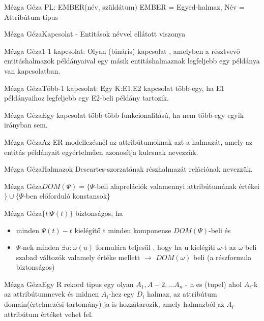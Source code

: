 \begin{definicio}{Mézga Géza}
PL: EMBER(név, szüldátum) EMBER = Egyed-halmaz, Név = Attribútum-típus
\end{definicio}\begin{definicio}{Mézga Géza}Kapcsolat - Entitások névvel ellátott viszonya
\end{definicio}\begin{definicio}{Mézga Géza}1-1 kapcsolat: Olyan (bináris) kapcsolat , amelyben a résztvevő entitáshalmazok példányaival egy másik entitáshalmaznak legfeljebb egy példánya van kapcsolatban.
\end{definicio}\begin{definicio}{Mézga Géza}Több-1 kapcsolat: Egy K:E1,E2 kapcsolat több-egy, ha E1 példányaihoz legfeljebb egy E2-beli példány tartozik.
\end{definicio}\begin{definicio}{Mézga Géza}Egy kapcsolat több-több funkcionalitású, ha nem több-egy egyik irányban sem.
\end{definicio}\begin{definicio}{Mézga Géza}Az ER modellezésnél az attribútumoknak azt a halmazát, amely az entitás példányait egyértelműen azonosítja kulcsnak nevezzük.
\end{definicio}\begin{definicio}{Mézga Géza}Halmazok Descartes-szorzatának részhalmazát relációnak nevezzük.
\end{definicio}\begin{definicio}{Mézga Géza}$DOM(\Psi) = \lbrace \Psi$-beli alaprelációk valamennyi attribútumának értékei$\rbrace \cup \lbrace \Psi$-ben előforduló konstansok$ \rbrace$
\end{definicio}\begin{definicio}{Mézga Géza}$\lbrace t | \Psi(t) \rbrace$ biztonságos, ha
  \begin{itemize}
    \item minden $\Psi(t)-t$ kielégítő t minden komponense $DOM(\Psi)$-beli és
    \item $\Psi$-nek minden $\exists u : \omega(u)$ formulára teljesül , hogy ha u kielégíti $\omega$-t  az $\omega$ beli szabad változók valamely értéke mellett $\longrightarrow$ $DOM(\omega)$ beli (a részformula biztonságos)
  \end{itemize}
\end{definicio}\begin{definicio}{Mézga Géza}Egy R rekord tipus egy olyan $A_1, A-2, \ldots A_n$ - n es (tupel) ahol $A_i$-k az attribútumnevek és midnen $A_i$-hez egy $D_i$ halmaz, az attribútum domain(értelmezési tartomány)-ja is hozzátarozik, amely halmazból az $A_i$ attribútum értéket vehet fel.

\end{definicio}
